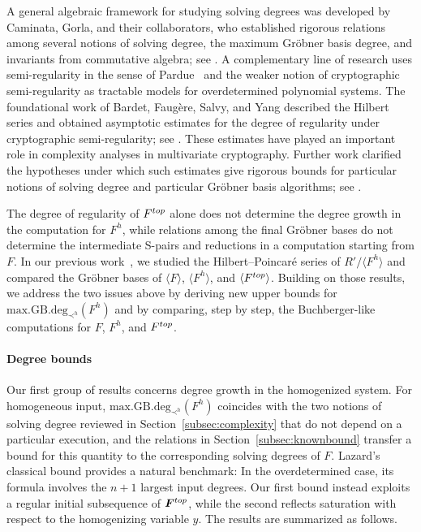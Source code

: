 \documentclass{article}
\theoremstyle{definition}
\theoremstyle{plain}
\theoremstyle{plain}
\theoremstyle{plain}
\theoremstyle{plain}
\numberwithin{equation}{subsection}
\begin{document}
A general algebraic framework for studying solving degrees was developed by Caminata, Gorla, and their collaborators, who established rigorous relations among several notions of solving degree, the maximum Gr\"obner basis degree, and invariants from commutative algebra; see \cite{CG20,GMP22,CG23}.
A complementary line of research uses semi-regularity in the sense of Pardue~\cite{Pardue} and the weaker notion of cryptographic semi-regularity as tractable models for overdetermined polynomial systems.
The foundational work of Bardet, Faug\`ere, Salvy, and Yang described the Hilbert series and obtained asymptotic estimates for the degree of regularity under cryptographic semi-regularity; see \cite{Bar,BFS,BFSY}.
These estimates have played an important role in complexity analyses in multivariate cryptography.
Further work clarified the hypotheses under which such estimates give rigorous bounds for particular notions of solving degree and particular Gr\"obner basis algorithms; see \cite{BNDGMT21,GG23-2}.

The degree of regularity of $F^{\rm top}$ alone does not determine the degree growth in the computation for $F^h$, while relations among the final Gr\"obner bases do not determine the intermediate S-pairs and reductions in a computation starting from $F$.
In our previous work~\cite{KY}, we studied the Hilbert--Poincar\'e series of $R'/\langle F^h\rangle$ and compared the Gr\"obner bases of $\langle F\rangle$, $\langle F^h\rangle$, and $\langle F^{\rm top}\rangle$.
Building on those results, we address the two issues above by deriving new upper bounds for $\mathrm{max.GB.deg}_{\prec^h}(F^h)$ and by comparing, step by step, the Buchberger-like computations for $F$, $F^h$, and $F^{\rm top}$.

\paragraph{Degree bounds}
Our first group of results concerns degree growth in the homogenized system.
For homogeneous input, $\mathrm{max.GB.deg}_{\prec^h}(F^h)$ coincides with the two notions of solving degree reviewed in Section~\ref{subsec:complexity} that do not depend on a particular execution, and the relations in Section~\ref{subsec:knownbound} transfer a bound for this quantity to the corresponding solving degrees of $F$.
Lazard's classical bound provides a natural benchmark:
In the overdetermined case, its formula involves the $n+1$ largest input degrees.
Our first bound instead exploits a regular initial subsequence of $\bm F^{\rm top}$, while the second reflects saturation with respect to the homogenizing variable $y$.
The results are summarized as follows.
\end{document}
